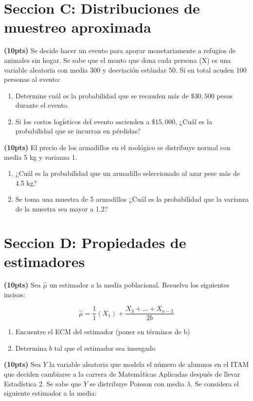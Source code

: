\documentclass[addpoints]{exam}
\theoremstyle{mytheor}
\begin{document}
\begin{questions}
\section*{Seccion C: Distribuciones de muestreo aproximada}

\question \textbf{(10pts)} 
Se decide hacer un evento para apoyar monetariamente a refugios de animales sin hogar. Se sabe que el monto que dona cada persona (X) es una variable aleatoria con media 300 y desviación estándar 50. Si en total acuden 100 personas al evento:

\begin{enumerate}[label=\Alph*)]
\item Determine cuál es la probabilidad que se recauden más de $\$30,500$ pesos durante el evento.
\item Si los costos logísticos del evento ascienden a $\$15,000$, ¿Cuál es la probabilidad que se incurran en pérdidas?
\end{enumerate}

\question \textbf{(10pts)} El precio de los armadillos en el zoológico se distribuye normal con media 5 kg y varianza 1.

\begin{enumerate}[label=\Alph*)]
\item ¿Cuál es la probabilidad que un armadillo seleccionado al azar pese más de 4.5 kg?
\item Se toma una muestra de 5 armadillos ¿Cuál es la probabilidad que la varianza de la muestra sea mayor a 1.2?
\end{enumerate}
  

\section*{Seccion D: Propiedades de estimadores}

\question \textbf{(10pts)} Sea $\hat{\mu}$ un estimador a la media poblacional. Resuelva los siguientes incisos: 
   
$$\hat{\mu} = \frac{1}{1} (X_1) + \frac{X_3+...+X_{n-3}}{2b} $$

\begin{enumerate}[label=\Alph*)]
\item Encuentre el ECM del estimador (poner en términos de b)
\item Determina $b$ tal que el estimador sea insesgado
\end{enumerate}

\question \textbf{(10pts)} Sea $Y$ la variable aleatoria que modela el número de alumnos en el ITAM que deciden cambiarse a la carrera de Matemáticas Aplicadas después de llevar Estadística 2. Se sabe que $Y$ se distribuye Poisson con media $\lambda$. Se considera el siguiente estimador a la media:


\end{questions}
\end{document}
